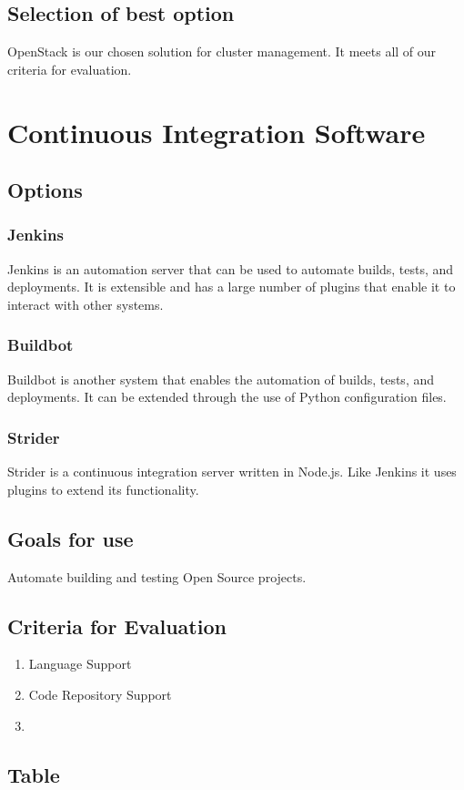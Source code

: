 \documentclass[10pt,letterpaper,onecolumn,journal]{IEEEtran}
\begin{document}
\subsection{Selection of best option}
OpenStack is our chosen solution for cluster management. It meets all of our criteria for evaluation.


\section{Continuous Integration Software}
\subsection{Options}
\subsubsection{Jenkins}
Jenkins is an automation server that can be used to automate builds, tests, and deployments.
It is extensible and has a large number of plugins that enable it to interact with other systems. 
\subsubsection{Buildbot}
Buildbot is another system that enables the automation of builds, tests, and deployments.
It can be extended through the use of Python configuration files. 
\subsubsection{Strider}
Strider is a continuous integration server written in Node.js.
Like Jenkins it uses plugins to extend its functionality.
\subsection{Goals for use}
Automate building and testing Open Source projects.
\subsection{Criteria for Evaluation}
\begin{enumerate}
  \item Language Support
  \item Code Repository Support
  \item 
\end{enumerate}
\subsection{Table}
\end{document}
